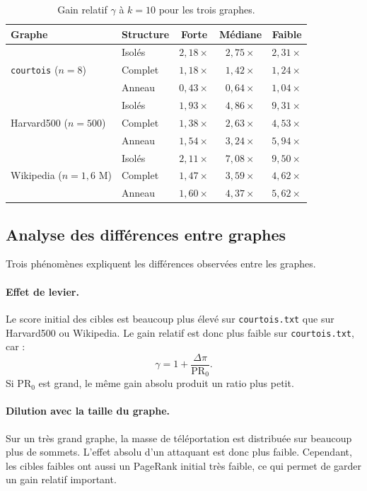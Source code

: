 \documentclass[12pt,a4paper]{article}
\newcommand{\PR}{\mathrm{PR}}
\theoremstyle{definition}
\begin{document}
\begin{table}[H]
\centering
\caption{Gain relatif $\gamma$ à $k=10$ pour les trois graphes.}
\label{tab:comparaison-k10}
\small
\begin{tabular}{llccc}
\toprule
\textbf{Graphe} & \textbf{Structure} & \textbf{Forte} & \textbf{Médiane} & \textbf{Faible} \\
\midrule
\multirow{3}{*}{\texttt{courtois} ($n=8$)}
 & Isolés  & $2{,}18\times$ & $2{,}75\times$ & $2{,}31\times$ \\
 & Complet & $1{,}18\times$ & $1{,}42\times$ & $1{,}24\times$ \\
 & Anneau  & $0{,}43\times$ & $0{,}64\times$ & $1{,}04\times$ \\
\midrule
\multirow{3}{*}{Harvard500 ($n=500$)}
 & Isolés  & $1{,}93\times$ & $4{,}86\times$ & $9{,}31\times$ \\
 & Complet & $1{,}38\times$ & $2{,}63\times$ & $4{,}53\times$ \\
 & Anneau  & $1{,}54\times$ & $3{,}24\times$ & $5{,}94\times$ \\
\midrule
\multirow{3}{*}{Wikipedia ($n=1{,}6$ M)}
 & Isolés  & $2{,}11\times$ & $7{,}08\times$ & $9{,}50\times$ \\
 & Complet & $1{,}47\times$ & $3{,}59\times$ & $4{,}62\times$ \\
 & Anneau  & $1{,}60\times$ & $4{,}37\times$ & $5{,}62\times$ \\
\bottomrule
\end{tabular}
\end{table}

\subsection{Analyse des différences entre graphes}

Trois phénomènes expliquent les différences observées entre les graphes.

\paragraph{Effet de levier.}
Le score initial des cibles est beaucoup plus élevé sur \texttt{courtois.txt}
que sur Harvard500 ou Wikipedia. Le gain relatif est donc plus faible sur
\texttt{courtois.txt}, car :
\[
\gamma = 1 + \frac{\Delta\pi}{\PR_0}.
\]
Si $\PR_0$ est grand, le même gain absolu produit un ratio plus petit.

\paragraph{Dilution avec la taille du graphe.}
Sur un très grand graphe, la masse de téléportation est distribuée sur beaucoup
plus de sommets. L'effet absolu d'un attaquant est donc plus faible. Cependant,
les cibles faibles ont aussi un PageRank initial très faible, ce qui permet de
garder un gain relatif important.
\end{document}
